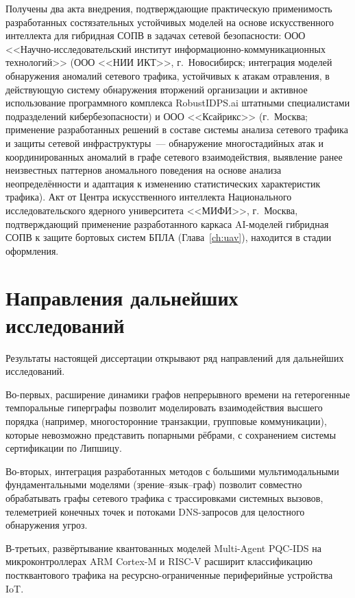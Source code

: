 Получены два акта внедрения, подтверждающие практическую применимость разработанных состязательных устойчивых моделей на основе искусственного интеллекта для гибридная СОПВ в задачах сетевой безопасности: ООО <<Научно-исследовательский институт информационно-коммуникационных технологий>> (ООО <<НИИ ИКТ>>, г.~Новосибирск; интеграция моделей обнаружения аномалий сетевого трафика, устойчивых к атакам отравления, в действующую систему обнаружения вторжений организации и активное использование программного комплекса RobustIDPS.ai штатными специалистами подразделений кибербезопасности) и ООО <<Ксайрикс>> (г.~Москва; применение разработанных решений в составе системы анализа сетевого трафика и защиты сетевой инфраструктуры~--- обнаружение многостадийных атак и координированных аномалий в графе сетевого взаимодействия, выявление ранее неизвестных паттернов аномального поведения на основе анализа неопределённости и адаптация к изменению статистических характеристик трафика). Акт от Центра искусственного интеллекта Национального исследовательского ядерного университета <<МИФИ>>, г.~Москва, подтверждающий применение разработанного каркаса AI-моделей гибридная СОПВ к защите бортовых систем БПЛА (Глава~\ref{ch:uav}), находится в стадии оформления.

\section*{Направления дальнейших исследований}

Результаты настоящей диссертации открывают ряд направлений для дальнейших исследований.

Во-первых, расширение динамики графов непрерывного времени на гетерогенные темпоральные гиперграфы позволит моделировать взаимодействия высшего порядка (например, многосторонние транзакции, групповые коммуникации), которые невозможно представить попарными рёбрами, с сохранением системы сертификации по Липшицу.

Во-вторых, интеграция разработанных методов с большими мультимодальными фундаментальными моделями (зрение--язык--граф) позволит совместно обрабатывать графы сетевого трафика с трассировками системных вызовов, телеметрией конечных точек и потоками DNS-запросов для целостного обнаружения угроз.

В-третьих, развёртывание квантованных моделей Multi-Agent PQC-IDS на микроконтроллерах ARM Cortex-M и RISC-V расширит классификацию постквантового трафика на ресурсно-ограниченные периферийные устройства IoT.

